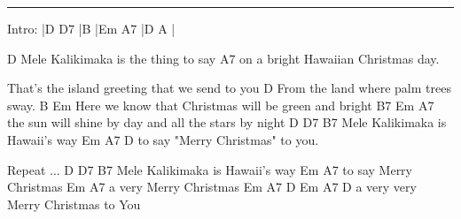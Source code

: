 \noindent\rule{\columnwidth}{1pt}

\begin{lstsong}
Intro:  |D  D7 |B  |Em A7 |D  A  |

D
Mele Kalikimaka is the thing to say
                               A7
on a bright Hawaiian Christmas day.
 
That's the island greeting that we send to you
                               D
From the land where palm trees sway.
B                                    Em
Here we know that Christmas will be  green and bright
    B7                                Em       A7
the sun will shine by day and all the stars by night
D                    D7     B7
Mele Kalikimaka is Hawaii's way
 Em         A7              D
to say "Merry Christmas" to you.

Repeat ...
D                    D7     B7
Mele Kalikimaka is Hawaii's way
 Em          A7
to say Merry Christmas
  Em         A7
a very Merry Christmas
  Em              A7            D    Em A7 D
a very very Merry Christmas  to You
\end{lstsong}
\newpage

